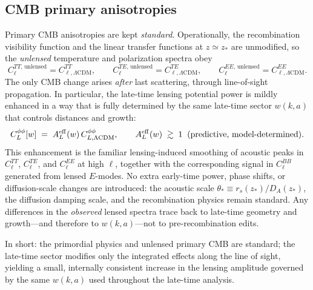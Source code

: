 \documentclass[11pt]{article}
\begin{document}
\subsection{CMB primary anisotropies}\label{sec:cmb-primary}
Primary CMB anisotropies are kept \emph{standard}. Operationally, the recombination visibility function and the linear transfer functions at $z\simeq z_\ast$ are unmodified, so the \emph{unlensed} temperature and polarization spectra obey
\begin{equation}
  C_\ell^{TT,\,\mathrm{unlensed}} = C_{\ell,\Lambda\mathrm{CDM}}^{TT},
  \qquad
  C_\ell^{TE,\,\mathrm{unlensed}} = C_{\ell,\Lambda\mathrm{CDM}}^{TE},
  \qquad
  C_\ell^{EE,\,\mathrm{unlensed}} = C_{\ell,\Lambda\mathrm{CDM}}^{EE}.
\end{equation}
The only CMB change arises \emph{after} last scattering, through line-of-sight propagation. In particular, the late-time lensing potential power is mildly enhanced in a way that is fully determined by the same late-time sector $w(k,a)$ that controls distances and growth:
\begin{equation}
  C_L^{\phi\phi}[w] \;=\; A_L^{\rm eff}(w)\,C_{L,\Lambda\mathrm{CDM}}^{\phi\phi},
  \qquad
  A_L^{\rm eff}(w) \;\gtrsim\; 1 \;\; \text{(predictive, model-determined)}.
\end{equation}
This enhancement is the familiar lensing-induced smoothing of acoustic peaks in $C_\ell^{TT}$, $C_\ell^{TE}$, and $C_\ell^{EE}$ at high $\ell$, together with the corresponding signal in $C_\ell^{BB}$ generated from lensed $E$-modes. No extra early-time power, phase shifts, or diffusion-scale changes are introduced: the acoustic scale $\theta_\ast \equiv r_s(z_\ast)/D_A(z_\ast)$, the diffusion damping scale, and the recombination physics remain standard. Any differences in the \emph{observed} lensed spectra trace back to late-time geometry and growth---and therefore to $w(k,a)$---not to pre-recombination edits.

In short: the primordial physics and unlensed primary CMB are standard; the late-time sector modifies only the integrated effects along the line of sight, yielding a small, internally consistent increase in the lensing amplitude governed by the same $w(k,a)$ used throughout the late-time analysis.
\end{document}
